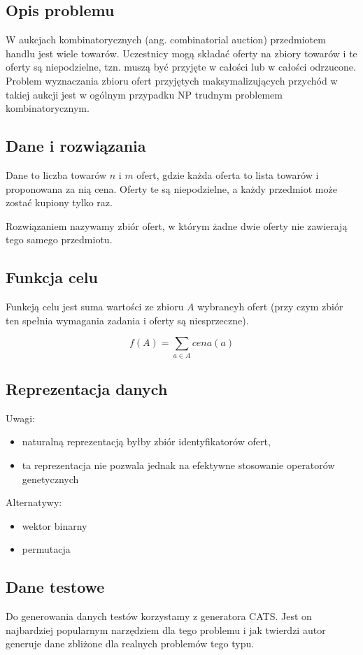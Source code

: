 \subsection{Opis problemu}
W aukcjach kombinatorycznych (ang. combinatorial auction) przedmiotem handlu jest wiele towarów.
Uczestnicy mogą składać oferty na zbiory towarów i te oferty są niepodzielne, tzn. muszą być przyjęte w całości lub w całości odrzucone. Problem wyznaczania zbioru ofert przyjętych maksymalizujących
        przychód w takiej aukcji jest w ogólnym przypadku NP trudnym problemem kombinatorycznym.

\subsection{Dane i rozwiązania}
Dane to liczba towarów $n$ i $m$ ofert, gdzie każda oferta to lista towarów i proponowana za nią cena.
Oferty te są niepodzielne, a każdy przedmiot może zostać kupiony tylko raz.


Rozwiązaniem nazywamy zbiór ofert, w którym żadne dwie oferty nie zawierają tego samego przedmiotu.

\subsection{Funkcja celu}
Funkcją celu jest suma wartości ze zbioru $A$ wybrancyh ofert (przy czym zbiór ten spełnia wymagania zadania i oferty są niesprzeczne).

\begin{equation}
    f(A) = \sum\limits_{a \in A} cena(a)
\end{equation}

\subsection{Reprezentacja danych}
Uwagi:
\begin{itemize}
    \item naturalną reprezentacją byłby zbiór identyfikatorów ofert,
    \item ta reprezentacja nie pozwala jednak na efektywne stosowanie operatorów genetycznych
\end{itemize}
\vspace{1em}
Alternatywy:
\begin{itemize}
    \item wektor binarny
    \item permutacja
\end{itemize}

\subsection{Dane testowe}
    Do generowania danych testów korzystamy z generatora CATS. Jest on najbardziej popularnym narzędziem dla tego problemu i jak twierdzi autor generuje dane zbliżone dla realnych problemów tego typu.






